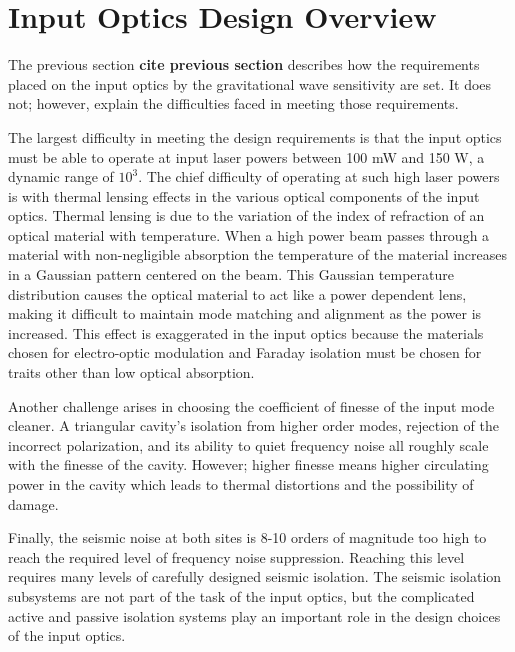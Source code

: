 
\section{Input Optics Design Overview}

The previous section \textbf{cite previous section} describes how the requirements placed on the 
input optics by the gravitational wave sensitivity are set.  
It does not; however, explain the difficulties faced in meeting those requirements.  

The largest difficulty in meeting the design requirements is that the input optics 
must be able to operate at input laser powers between 100 mW and 150 W, 
a dynamic range of $10^3$.  
The chief difficulty of operating at such high laser powers is with thermal lensing 
effects in the various optical components of the input optics.  
Thermal lensing is due to the variation of the index of refraction of an optical 
material with temperature.  
When a high power beam passes through a material with non-negligible absorption 
the temperature of the material increases in a Gaussian pattern centered on the beam.  
This Gaussian temperature distribution causes the optical material to act like a power 
dependent lens, making it difficult to maintain mode matching and alignment as the power 
is increased.  
This effect is exaggerated in the input optics because the materials chosen for electro-optic 
modulation and Faraday isolation must be chosen for traits other than low optical absorption.

Another challenge arises in choosing the coefficient of finesse of the input mode cleaner.  
A triangular cavity's isolation from higher order modes, rejection of the incorrect polarization, 
and its ability to quiet frequency noise all roughly scale with the finesse of the cavity.  
However; higher finesse means higher circulating power in the cavity which leads to thermal 
distortions and the possibility of damage.  

Finally, the seismic noise at both sites is 8-10 orders of magnitude too high to reach 
the required level of frequency noise suppression.  
Reaching this level requires many levels of carefully designed seismic isolation.  
The seismic isolation subsystems are not part of the task of the input optics, but 
the complicated active and passive isolation systems play an important role in 
the design choices of the input optics.  

